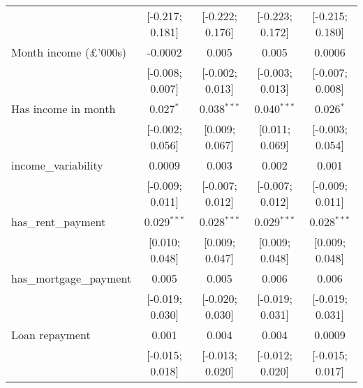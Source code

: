 \begin{table}[htbp]
\begin{threeparttable}[b]
\begin{tabular}{lcccc}
                                  & [-0.217; 0.181]                  & [-0.222; 0.176]                  & [-0.223; 0.172]                                & [-0.215; 0.180]\\   
         Month income (£'000s)    & -0.0002                          & 0.005                            & 0.005                                          & 0.0006\\   
                                  & [-0.008; 0.007]                  & [-0.002; 0.013]                  & [-0.003; 0.013]                                & [-0.007; 0.008]\\   
         Has income in month      & 0.027$^{*}$                      & 0.038$^{***}$                    & 0.040$^{***}$                                  & 0.026$^{*}$\\   
                                  & [-0.002; 0.056]                  & [0.009; 0.067]                   & [0.011; 0.069]                                 & [-0.003; 0.054]\\   
         income\_variability      & 0.0009                           & 0.003                            & 0.002                                          & 0.001\\   
                                  & [-0.009; 0.011]                  & [-0.007; 0.012]                  & [-0.007; 0.012]                                & [-0.009; 0.011]\\   
         has\_rent\_payment       & 0.029$^{***}$                    & 0.028$^{***}$                    & 0.029$^{***}$                                  & 0.028$^{***}$\\   
                                  & [0.010; 0.048]                   & [0.009; 0.047]                   & [0.009; 0.048]                                 & [0.009; 0.048]\\   
         has\_mortgage\_payment   & 0.005                            & 0.005                            & 0.006                                          & 0.006\\   
                                  & [-0.019; 0.030]                  & [-0.020; 0.030]                  & [-0.019; 0.031]                                & [-0.019; 0.031]\\   
         Loan repayment           & 0.001                            & 0.004                            & 0.004                                          & 0.0009\\   
                                  & [-0.015; 0.018]                  & [-0.013; 0.020]                  & [-0.012; 0.020]                                & [-0.015; 0.017]\\   

\end{tabular}
\end{threeparttable}
\end{table}
